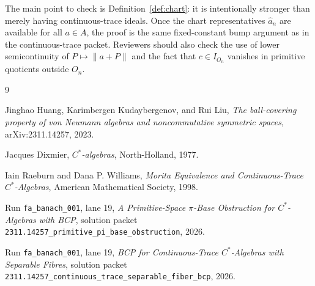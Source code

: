 \documentclass[11pt]{article}
\begin{document}
The main point to check is Definition~\ref{def:chart}: it is intentionally
stronger than merely having continuous-trace ideals.  Once the chart
representatives \(\widehat a_n\) are available for all \(a\in A\), the proof
is the same fixed-constant bump argument as in the continuous-trace packet.
Reviewers should also check the use of lower semicontinuity of
\(P\mapsto\|a+P\|\) and the fact that \(c\in I_{O_n}\) vanishes in primitive
quotients outside \(O_n\).

\begin{thebibliography}{9}

Jinghao Huang, Karimbergen Kudaybergenov, and Rui Liu,
\emph{The ball-covering property of von Neumann algebras and noncommutative
symmetric spaces},
arXiv:2311.14257, 2023.

Jacques Dixmier,
\emph{\(C^*\)-algebras},
North-Holland, 1977.

Iain Raeburn and Dana P. Williams,
\emph{Morita Equivalence and Continuous-Trace \(C^*\)-Algebras},
American Mathematical Society, 1998.

Run \texttt{fa\_banach\_001}, lane 19,
\emph{A Primitive-Space \(\pi\)-Base Obstruction for \(C^*\)-Algebras with
BCP},
solution packet
\texttt{2311.14257\_primitive\_pi\_base\_obstruction}, 2026.

Run \texttt{fa\_banach\_001}, lane 19,
\emph{BCP for Continuous-Trace \(C^*\)-Algebras with Separable Fibres},
solution packet
\texttt{2311.14257\_continuous\_trace\_separable\_fiber\_bcp}, 2026.

\end{thebibliography}
\end{document}
